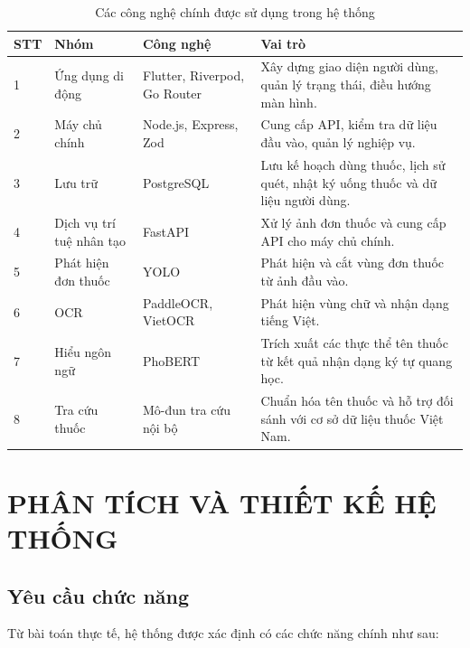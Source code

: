 \documentclass[12pt,a4paper]{report}
\renewcommand{\arraystretch}{1.25}
\begin{document}
\begin{table}[htbp]
\centering
\caption{Các công nghệ chính được sử dụng trong hệ thống}
\label{tab:tech-stack}
{\renewcommand{\arraystretch}{1.4}
\begin{tabularx}{\textwidth}{C{1.2cm}L{3.7cm}L{3.3cm}Y}
\toprule
\textbf{STT} & \textbf{Nhóm} & \textbf{Công nghệ} & \textbf{Vai trò} \\
 & Ứng dụng di động & Flutter, Riverpod, Go Router & Xây dựng giao diện người dùng, quản lý trạng thái, điều hướng màn hình. \\
2 & Máy chủ chính & Node.js, Express, Zod & Cung cấp API, kiểm tra dữ liệu đầu vào, quản lý nghiệp vụ. \\
3 & Lưu trữ & PostgreSQL & Lưu kế hoạch dùng thuốc, lịch sử quét, nhật ký uống thuốc và dữ liệu người dùng. \\
4 & Dịch vụ trí tuệ nhân tạo & FastAPI \cite{fastapi} & Xử lý ảnh đơn thuốc và cung cấp API cho máy chủ chính. \\
5 & Phát hiện đơn thuốc & YOLO & Phát hiện và cắt vùng đơn thuốc từ ảnh đầu vào. \\
6 & OCR & PaddleOCR, VietOCR & Phát hiện vùng chữ và nhận dạng tiếng Việt. \\
7 & Hiểu ngôn ngữ & PhoBERT & Trích xuất các thực thể tên thuốc từ kết quả nhận dạng ký tự quang học. \\
8 & Tra cứu thuốc & Mô-đun tra cứu nội bộ & Chuẩn hóa tên thuốc và hỗ trợ đối sánh với cơ sở dữ liệu thuốc Việt Nam. \\
\bottomrule
\end{tabularx}}
\end{table}

\chapter{PHÂN TÍCH VÀ THIẾT KẾ HỆ THỐNG}

\section{Yêu cầu chức năng}

Từ bài toán thực tế, hệ thống được xác định có các chức năng chính như sau:
\end{document}
